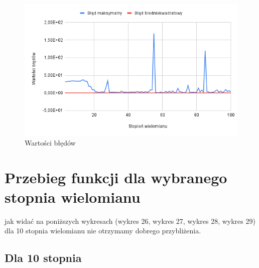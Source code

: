 \documentclass{article}
\begin{document}
\begin{figure}[H]
  \centering
  \begin{minipage}[b]{0.4\textwidth}
    \includegraphics[width=\textwidth]{img27.png}
    \caption{Wartości błędów}
  \end{minipage}
\end{figure}

\newpage

\section{Przebieg funkcji dla wybranego stopnia wielomianu}

jak widać na poniższych wykresach (wykres 26, wykres 27, wykres 28, wykres 29) dla 10 stopnia wielomianu nie otrzymamy dobrego przybliżenia.

\subsection{Dla 10 stopnia}
\end{document}
